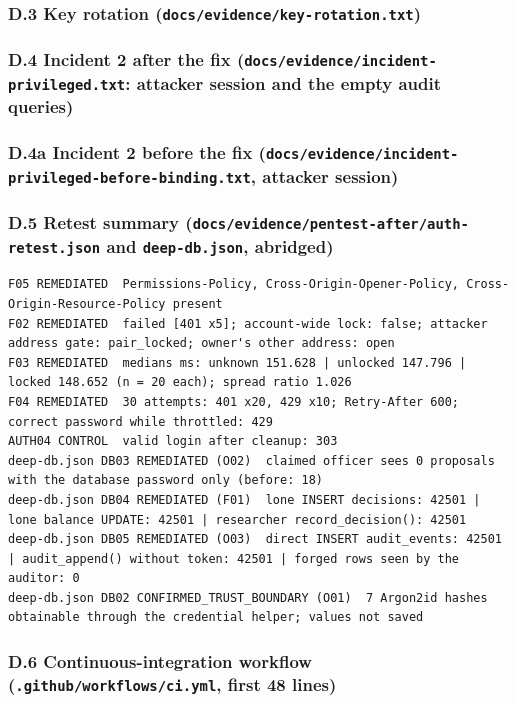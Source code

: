 \documentclass[10pt,a4paper]{article}
\newcommand{\code}[1]{\nolinkurl{#1}}
\begin{document}
\subsubsection*{D.3 Key rotation (\code{docs/evidence/key-rotation.txt})}


\subsubsection*{D.4 Incident 2 after the fix (\code{docs/evidence/incident-privileged.txt}: attacker session and the empty audit queries)}


\subsubsection*{D.4a Incident 2 before the fix (\code{docs/evidence/incident-privileged-before-binding.txt}, attacker session)}


\subsubsection*{D.5 Retest summary (\code{docs/evidence/pentest-after/auth-retest.json} and \code{deep-db.json}, abridged)}
\begin{lstlisting}
F05 REMEDIATED  Permissions-Policy, Cross-Origin-Opener-Policy, Cross-Origin-Resource-Policy present
F02 REMEDIATED  failed [401 x5]; account-wide lock: false; attacker address gate: pair_locked; owner's other address: open
F03 REMEDIATED  medians ms: unknown 151.628 | unlocked 147.796 | locked 148.652 (n = 20 each); spread ratio 1.026
F04 REMEDIATED  30 attempts: 401 x20, 429 x10; Retry-After 600; correct password while throttled: 429
AUTH04 CONTROL  valid login after cleanup: 303
deep-db.json DB03 REMEDIATED (O02)  claimed officer sees 0 proposals with the database password only (before: 18)
deep-db.json DB04 REMEDIATED (F01)  lone INSERT decisions: 42501 | lone balance UPDATE: 42501 | researcher record_decision(): 42501
deep-db.json DB05 REMEDIATED (O03)  direct INSERT audit_events: 42501 | audit_append() without token: 42501 | forged rows seen by the auditor: 0
deep-db.json DB02 CONFIRMED_TRUST_BOUNDARY (O01)  7 Argon2id hashes obtainable through the credential helper; values not saved
\end{lstlisting}

\subsubsection*{D.6 Continuous-integration workflow (\code{.github/workflows/ci.yml}, first 48 lines)}







\end{document}
